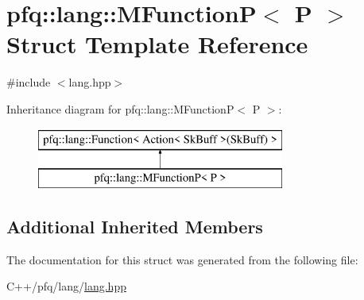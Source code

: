 \hypertarget{structpfq_1_1lang_1_1MFunctionP}{\section{pfq\+:\+:lang\+:\+:M\+Function\+P$<$ P $>$ Struct Template Reference}
\label{structpfq_1_1lang_1_1MFunctionP}
}


{\ttfamily \#include $<$lang.\+hpp$>$}

Inheritance diagram for pfq\+:\+:lang\+:\+:M\+Function\+P$<$ P $>$\+:\begin{figure}[H]
\begin{center}
\leavevmode
\includegraphics[height=2.000000cm]{structpfq_1_1lang_1_1MFunctionP}
\end{center}
\end{figure}
\subsection*{Additional Inherited Members}


The documentation for this struct was generated from the following file\+:\begin{DoxyCompactItemize}
\item 
C++/pfq/lang/\hyperlink{lang_8hpp}{lang.\+hpp}\end{DoxyCompactItemize}
